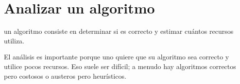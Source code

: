 \section{Analizar un algoritmo}

 un algoritmo consiste en determinar si es correcto y estimar cuántos recursos utiliza. 

El análisis es importante porque uno quiere que su algoritmo sea correcto y utilice pocos recursos. Eso suele ser difícil; a menudo hay algoritmos correctos pero costosos o austeros pero heurísticos.

